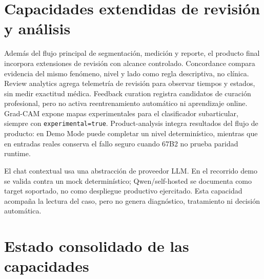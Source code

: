 \section{Capacidades extendidas de revisión y análisis}

Además del flujo principal de segmentación, medición y reporte, el producto final incorpora extensiones de revisión con alcance controlado. Concordance compara evidencia del mismo fenómeno, nivel y lado como regla descriptiva, no clínica. Review analytics agrega telemetría de revisión para observar tiempos y estados, sin medir exactitud médica. Feedback curation registra candidatos de curación profesional, pero no activa reentrenamiento automático ni aprendizaje online. Grad-CAM expone mapas experimentales para el clasificador subarticular, siempre con \texttt{experimental=true}. Product-analysis integra resultados del flujo de producto: en Demo Mode puede completar un nivel determinístico, mientras que en entradas reales conserva el fallo seguro cuando 67B2 no prueba paridad runtime.

El chat contextual usa una abstracción de proveedor LLM. En el recorrido demo se valida contra un mock determinístico; Qwen/self-hosted se documenta como target soportado, no como despliegue productivo ejercitado. Esta capacidad acompaña la lectura del caso, pero no genera diagnóstico, tratamiento ni decisión automática.
\section{Estado consolidado de las capacidades}

